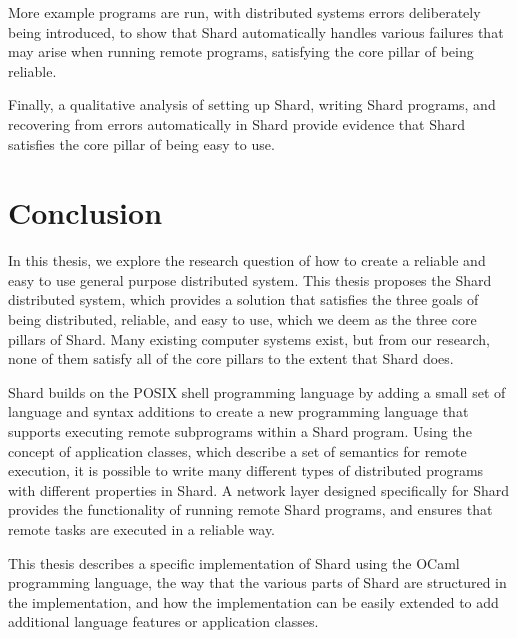 \documentclass[twoside]{report}
\newcommand{\todoi}[1]{\todo[inline, color=blue!20]{TODO: {#1}}}
\begin{document}
More example programs are run, with distributed systems errors deliberately being introduced, to show that Shard automatically handles various failures that may arise when running remote programs, satisfying the core pillar of being reliable.

Finally, a qualitative analysis of setting up Shard, writing Shard programs, and recovering from errors automatically in Shard provide evidence that Shard satisfies the core pillar of being easy to use.

\chapter{Conclusion}


In this thesis, we explore the research question of how to create a reliable and easy to use general purpose distributed system.
This thesis proposes the Shard distributed system, which provides a solution that satisfies the three goals of being distributed, reliable, and easy to use, which we deem as the three core pillars of Shard.
Many existing computer systems exist, but from our research, none of them satisfy all of the core pillars to the extent that Shard does.

Shard builds on the POSIX shell programming language by adding a small set of language and syntax additions to create a new programming language that supports executing remote subprograms within a Shard program.
Using the concept of application classes, which describe a set of semantics for remote execution, it is possible to write many different types of distributed programs with different properties in Shard.
A network layer designed specifically for Shard provides the functionality of running remote Shard programs, and ensures that remote tasks are executed in a reliable way.

This thesis describes a specific implementation of Shard using the OCaml programming language, the way that the various parts of Shard are structured in the implementation, and how the implementation can be easily extended to add additional language features or application classes.
\end{document}
